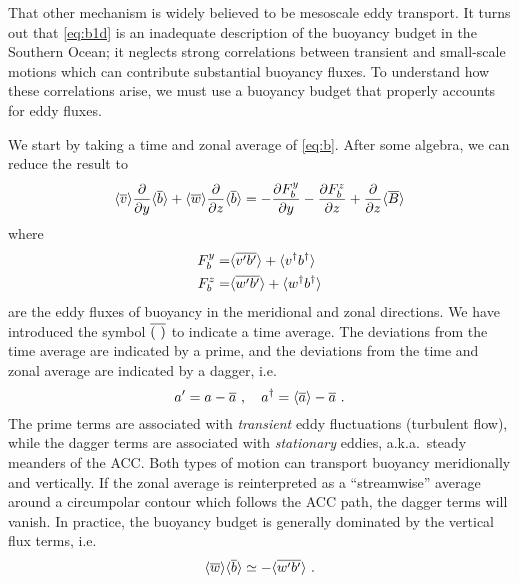 \documentclass[12pt]{article}
\newcommand{\pd}[2]{ \frac{\partial #1}{\partial #2} }
\newcommand{\ab}[1]{\ensuremath{\langle #1 \rangle}}
\newcommand{\ol}{\ensuremath{\overline}}
\begin{document}
That other mechanism is widely believed to be mesoscale eddy transport. It turns out that \eqref{eq:b1d} is an inadequate description of the buoyancy budget in the Southern Ocean; it neglects strong correlations between transient and small-scale motions which can contribute substantial buoyancy fluxes. To understand how these correlations arise, we must use a buoyancy budget that properly accounts for eddy fluxes.

We start by taking a time and zonal average of \eqref{eq:b}. After some algebra, we can reduce the result to
\begin{equation}
\ab{\ol{v}} \pd{}{y} \ab{\ol{b}} + \ab{\ol{w}} \pd{}{z} \ab{\ol{b}} = - \pd{F^y_b}{y}  - \pd{F^z_b}{z} + \pd{}{z}\ab{\ol{B}}
\label{eq:b1}
\end{equation}
where 
\begin{align}
F^y_b = &\ab{\ol{v'b'}} + \ab{v^\dagger b^\dagger} \\
F^z_b = & \ab{\ol{w'b'}} + \ab{w^\dagger b^\dagger}
\end{align}
are the eddy fluxes of buoyancy in the meridional and zonal directions. We have introduced the symbol $\ol{( \ )}$ to indicate a time average. The deviations from the time average are indicated by a prime, and the deviations from the time and zonal average are indicated by a dagger, i.e.
\begin{equation}
a' = a - \ol{a} \ , \ \ \ a^\dagger = \ab{\ol{a}} - \ol{a} \ .
\end{equation}
The prime terms are associated with {\em transient} eddy fluctuations (turbulent flow), while the dagger terms are associated with {\em stationary} eddies, a.k.a.~steady meanders of the ACC. Both types of motion can transport buoyancy meridionally and vertically. If the zonal average is reinterpreted as a ``streamwise'' average around a circumpolar contour which follows the ACC path, the dagger terms will vanish. In practice, the buoyancy budget is generally dominated by the vertical flux terms, i.e.
\begin{equation}
\ab{\ol{w}} \ab{\ol{b}} \simeq -\ab{\ol{w'b'}} \ .
\end{equation}
\end{document}
